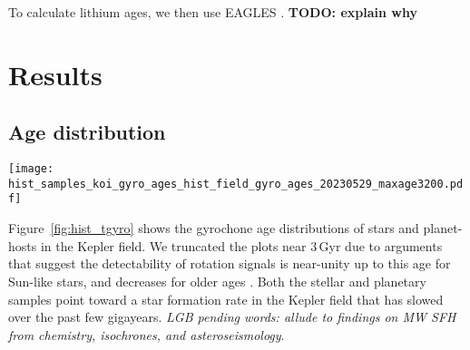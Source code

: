 \documentclass[11pt,twocolumn,tighten]{aastex63}
\begin{document}
To calculate lithium ages, we then use EAGLES \citep{Jeffries_2023}.
{\bf TODO: explain why}







\section{Results}
\label{sec:results}


\subsection{Age distribution}

\begin{figure*}[!t]
	\begin{center}
		\leavevmode
		\texttt{[image: hist\_samples\_koi\_gyro\_ages\_hist\_field\_gyro\_ages\_20230529\_maxage3200.pdf]}
	\end{center}
	\vspace{-0.6cm}
	\caption{
		{\bf Age distribution of stars and planet-hosts in the Kepler field
    inferred from rotation periods}.
    A histogram of samples from the age posteriors for all Kepler
    stars with reported rotation periods and temperatures is shown in
    light gray;
    the age calculation was actually valid for stars that meet the criteria
    discussed in Section~\ref{subsec:filters} (dark blue).
		\label{fig:hist_tgyro}
	}
\end{figure*}

Figure~\ref{fig:hist_tgyro} shows the gyrochone age distributions of
stars and planet-hosts in the Kepler field.
We truncated the plots near $3$\,Gyr due to arguments that suggest the
detectability of rotation signals is near-unity up to this age for
Sun-like stars, and decreases for older ages
\citep{2022ApJ...937...94M}.
Both the stellar and planetary samples point toward a star formation
rate in the Kepler field that has slowed over the past few gigayears.
{\it LGB pending words: allude to findings on MW SFH from chemistry,
isochrones, and asteroseismology}.
\end{document}
